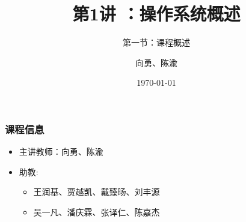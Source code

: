 


\title[第1讲]{第1讲 ：操作系统概述} %
\subtitle{第一节：课程概述}
\author{向勇、陈渝} %
\date{\today} %




\begin{frame}
\titlepage %
\end{frame}

%
%

\begin{frame}
	\frametitle{课程信息}
	\begin{itemize}
		\item 主讲教师：向勇、陈渝
		\pause

		\item 助教: 
\begin{itemize}
		\item 王润基、贾越凯、戴臻旸、刘丰源

		\item 吴一凡、潘庆霖、张译仁、陈嘉杰
	\end{itemize}
	\end{itemize}
\end{frame}


